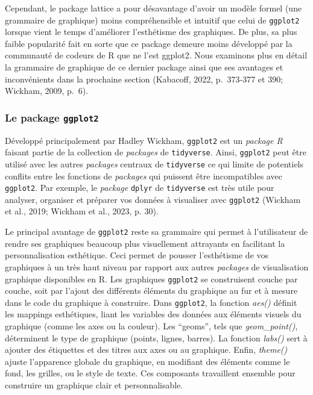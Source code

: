 \documentclass[
  letterpaper,
  DIV=11,
  numbers=noendperiod]{scrreprt}
\begin{document}
Cependant, le package lattice a pour désavantage d'avoir un modèle
formel (une grammaire de graphique) moins compréhensible et intuitif que
celui de \texttt{ggplot2} lorsque vient le temps d'améliorer
l'esthétisme des graphiques. De plus, sa plus faible popularité fait en
sorte que ce package demeure moins développé par la communauté de
codeurs de R que ne l'est ggplot2. Nous examinons plus en détail la
grammaire de graphique de ce dernier package ainsi que ses avantages et
inconvénients dans la prochaine section (Kabacoff, 2022, p.~373‑377 et
390; Wickham, 2009, p.~6).

\subsubsection{\texorpdfstring{Le package
\texttt{ggplot2}}{Le package ggplot2}}\label{le-package-ggplot2}

Développé principalement par Hadley Wickham, \texttt{ggplot2} est un
\emph{package R} faisant partie de la collection de \emph{packages} de
\texttt{tidyverse}. Ainsi, \texttt{ggplot2} peut être utilisé avec les
autres \emph{packages} centraux de \texttt{tidyverse} ce qui limite de
potentiels conflits entre les fonctions de \emph{packages} qui puissent
être incompatibles avec \texttt{ggplot2}. Par exemple, le \emph{package}
\texttt{dplyr} de \texttt{tidyverse} est très utile pour analyser,
organiser et préparer vos données à visualiser avec \texttt{ggplot2}
(Wickham et al., 2019; Wickham et al., 2023, p. 30).

Le principal avantage de \texttt{ggplot2} reste sa grammaire qui permet
à l'utilisateur de rendre ses graphiques beaucoup plus visuellement
attrayants en facilitant la personnalisation esthétique. Ceci permet de
pousser l'esthétisme de vos graphiques à un très haut niveau par rapport
aux autres \emph{packages} de visualisation graphique disponibles en R.
Les graphiques \texttt{ggplot2} se construisent couche par couche, soit
par l'ajout des différents éléments du graphique au fur et à mesure dans
le code du graphique à construire. Dans \texttt{ggplot2}, la fonction
\emph{aes()} définit les mappings esthétiques, liant les variables des
données aux éléments visuels du graphique (comme les axes ou la
couleur). Les ``geoms'', tels que \emph{geom\_point()}, déterminent le
type de graphique (points, lignes, barres). La fonction \emph{labs()}
sert à ajouter des étiquettes et des titres aux axes ou au graphique.
Enfin, \emph{theme()} ajuste l'apparence globale du graphique, en
modifiant des éléments comme le fond, les grilles, ou le style de texte.
Ces composants travaillent ensemble pour construire un graphique clair
et personnalisable.
\end{document}
